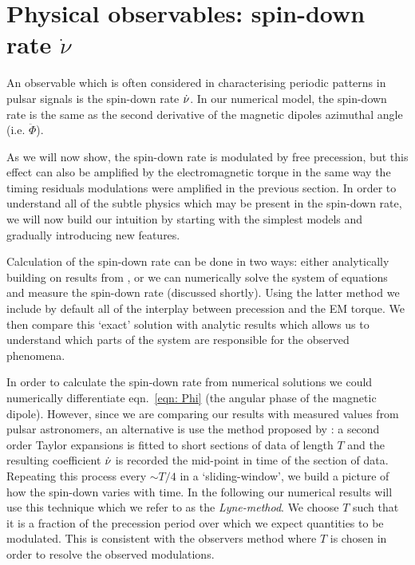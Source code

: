 \documentclass[../full_thesis/full_thesis.tex]{subfiles}
\begin{document}

\section{Physical observables: spin-down rate $\dot{\nu}$}
An observable which is often considered in characterising periodic patterns in
pulsar signals is the spin-down rate $\dot{\nu}$. In our numerical model, the
spin-down rate is the same as the second derivative of the magnetic dipoles
azimuthal angle (i.e. $\ddot{\Phi}$).

As we will now show, the spin-down rate is modulated by free precession, but
this effect can also be amplified by the electromagnetic torque in the same way
the timing residuals modulations were amplified in the previous section.
In order to understand all of the subtle physics which
may be present in the spin-down rate, we will now build our intuition by starting
with the simplest models and gradually introducing new features.

Calculation of the spin-down rate can be done in two ways: either analytically
building on results from \citet{Jones2001}, or we can numerically solve the
system of equations and measure the spin-down rate (discussed shortly). Using the
latter method we include by default all of the interplay between precession and
the EM torque. We then compare this `exact' solution with analytic results
which allows us to understand which parts of the system are responsible for the
observed phenomena.

In order to calculate the spin-down rate from numerical solutions we could
numerically differentiate eqn.~\eqref{eqn: Phi} (the angular phase of the
magnetic dipole). However, since we are comparing our results with measured
values from pulsar astronomers, an alternative is use the method proposed by
\citet{Lyne2010}: a second order Taylor expansions is fitted to short sections
of data of length $T$ and the resulting coefficient $\dot{\nu}$ is recorded the
mid-point in time of the section of data. Repeating this process every $\sim
T/4$ in a `sliding-window', we build a picture of how the spin-down varies with time.
In the following our numerical results will use this technique which we refer
to as the \emph{Lyne-method}.
We choose $T$ such that it is a fraction of the precession period over which we
expect quantities to be modulated. This is consistent with the observers method
where $T$ is chosen in order to resolve the observed modulations.
\end{document}
